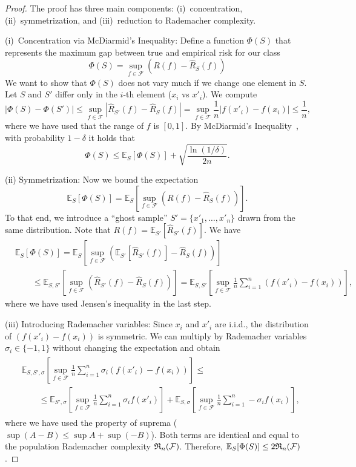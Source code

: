 \begin{proof}
The proof has three main components: (i)~concentration, (ii)~symmetrization, and (iii)~reduction to Rademacher complexity.

(i)~Concentration via McDiarmid’s Inequality:
Define a function $\Phi(S)$ that represents the maximum gap between true and empirical risk for our class
$$\Phi(S) = \sup_{f \in \mathcal{F}} (R(f) - \hat{R}_S(f))$$
We want to show that $\Phi(S)$ does not vary much if we change one element in $S$. Let $S$ and $S'$ differ only in the $i$-th element ($x_i$ vs $x'_i$).
We compute
$$|\Phi(S) - \Phi(S')| \leq \sup_{f \in \mathcal{F}} |\hat{R}_{S'}(f) - \hat{R}_S(f)| = \sup_{f \in \mathcal{F}} \frac{1}{n} |f(x'_i) - f(x_i)| \leq \frac{1}{n},$$
where we have used that the range of $f$ is $[0, 1]$. By McDiarmid’s Inequality~\cite{mcdiarmid1989method}, with probability $1 - \delta$ it holds that
\begin{equation}\label{eq:rade4}
\Phi(S) \leq \mathbb{E}_S[\Phi(S)] + \sqrt{\frac{\ln(1/\delta)}{2n}}.
\end{equation}

(ii) Symmetrization:
Now we bound the expectation 
$$\mathbb{E}_S[\Phi(S)] = \mathbb{E}_S \left[ \sup_{f \in \mathcal{F}} (R(f) - \hat{R}_S(f)) \right].$$
To that end, we introduce a ``ghost sample'' $S' = \{x'_1, \dots, x'_n\}$ drawn from the same distribution. Note that $R(f) = \mathbb{E}_{S'}[\hat{R}_{S'}(f)]$.
We have
\begin{align*}
&\mathbb{E}_S[\Phi(S)]  =  \mathbb{E}_S \left[ \sup_{f \in \mathcal{F}} (\mathbb{E}_{S'}[\hat{R}_{S'}(f)] - \hat{R}_S(f)) \right] \\
& \quad \quad \leq \mathbb{E}_{S, S'} \left[ \sup_{f \in \mathcal{F}} (\hat{R}_{S'}(f) - \hat{R}_S(f)) \right] = \mathbb{E}_{S, S'} \left[ \sup_{f \in \mathcal{F}} \frac{1}{n} \sum_{i=1}^n (f(x'_i) - f(x_i)) \right],
\end{align*}
where we have used Jensen’s inequality in the last step.

(iii) Introducing Rademacher variables:
Since $x_i$ and $x'_i$ are i.i.d., the distribution of $(f(x'_i) - f(x_i))$ is symmetric. We can multiply by Rademacher variables $\sigma_i \in \{-1, 1\}$ without changing the expectation and obtain
\begin{align}\label{eq:rade5}
\begin{split}
& \mathbb{E}_{S, S', \sigma} \left[ \sup_{f \in \mathcal{F}} \frac{1}{n} \sum_{i=1}^n \sigma_i (f(x'_i) - f(x_i)) \right]
\le  \\
& \qquad \leq \mathbb{E}_{S', \sigma} \left[ \sup_{f \in \mathcal{F}} \frac{1}{n} \sum_{i=1}^n \sigma_i f(x'_i) \right] + \mathbb{E}_{S, \sigma} \left[ \sup_{f \in \mathcal{F}} \frac{1}{n} \sum_{i=1}^n -\sigma_i f(x_i) \right],
\end{split}
\end{align}
where we have used the property of suprema ($\sup(A-B) \leq \sup A + \sup(-B)$).
Both terms are identical and equal to the population Rademacher complexity $\mathfrak{R}_n(\mathcal{F})$.
Therefore, $\mathbb{E}_S[\Phi(S)] \leq 2\mathfrak{R}_n(\mathcal{F})$.


\end{proof}
